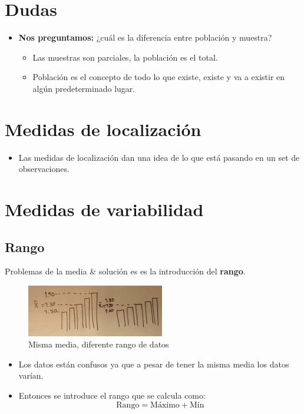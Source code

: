\section{Dudas}
\begin{itemize}
    \item \textbf{Nos preguntamos:} ¿cuál es la diferencia entre población y muestra?
        \begin{itemize}
            \item Las muestras son parciales, la población es el total.
            \item Población es el concepto de todo lo que existe, existe y va a existir en algún predeterminado lugar.
        \end{itemize}
\end{itemize}


\section{Medidas de localización}
\begin{itemize}
    \item Las medidas de localización dan una idea de lo que está pasando en un set de observaciones.
\end{itemize}


\section{Medidas de variabilidad}

\subsection{Rango}
Problemas de la media \& solución es es la introducción del \textbf{rango}.
\begin{figure}[htbp]
    \centering
    \includegraphics[width=6cm]{./../__Imagenes__/2020-01-16-EstadisticaI.jpeg}
    \caption{Misma media, diferente rango de datos}
    \label{}
\end{figure} 
\begin{itemize}
    \item Los datos están confusos ya que a pesar de tener la misma media los datos varían.
    \item Entonces se introduce el rango que se calcula como:
        \[
            \text{Rango} = \text{Máximo} + \text{Mín}
        \]
\end{itemize}

